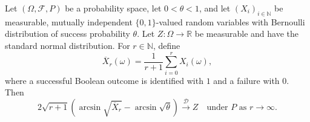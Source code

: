 \begin{theorem}
Let $(\Omega,\mathcal F,P)$ be a probability space, let $0<\theta<1$, and
let $(X_i)_{i\in\mathbb N}$ be measurable, mutually independent
$\{0,1\}$-valued random variables with Bernoulli distribution of success
probability $\theta$. Let $Z:\Omega\to\mathbb R$ be measurable and have
the standard normal distribution. For $r\in\mathbb N$, define
\[
 \overline X_r(\omega)=\frac1{r+1}\sum_{i=0}^r X_i(\omega),
\]
where a successful Boolean outcome is identified with $1$ and a failure
with $0$. Then
\[
 2\sqrt{r+1}\left(
 \arcsin\sqrt{\overline X_r}-\arcsin\sqrt\theta
 \right)
 \xrightarrow{\mathcal D} Z
 \quad\text{under }P\text{ as }r\to\infty.
\]
\end{theorem}
